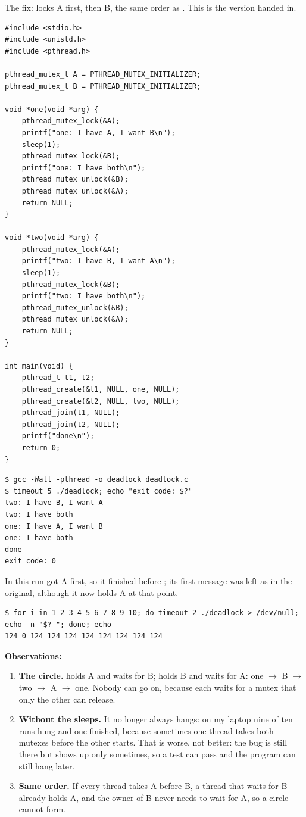 \documentclass[11pt,a4paper]{article}
\begin{document}
The fix:  locks A first, then B, the same order as . This is the
version handed in.

\begin{lstlisting}[style=ccode,caption={deadlock.c, fixed}]
#include <stdio.h>
#include <unistd.h>
#include <pthread.h>

pthread_mutex_t A = PTHREAD_MUTEX_INITIALIZER;
pthread_mutex_t B = PTHREAD_MUTEX_INITIALIZER;

void *one(void *arg) {
    pthread_mutex_lock(&A);
    printf("one: I have A, I want B\n");
    sleep(1);
    pthread_mutex_lock(&B);
    printf("one: I have both\n");
    pthread_mutex_unlock(&B);
    pthread_mutex_unlock(&A);
    return NULL;
}

void *two(void *arg) {
    pthread_mutex_lock(&A);
    printf("two: I have B, I want A\n");
    sleep(1);
    pthread_mutex_lock(&B);
    printf("two: I have both\n");
    pthread_mutex_unlock(&B);
    pthread_mutex_unlock(&A);
    return NULL;
}

int main(void) {
    pthread_t t1, t2;
    pthread_create(&t1, NULL, one, NULL);
    pthread_create(&t2, NULL, two, NULL);
    pthread_join(t1, NULL);
    pthread_join(t2, NULL);
    printf("done\n");
    return 0;
}
\end{lstlisting}

\begin{lstlisting}[caption={The fixed version}]
$ gcc -Wall -pthread -o deadlock deadlock.c
$ timeout 5 ./deadlock; echo "exit code: $?"
two: I have B, I want A
two: I have both
one: I have A, I want B
one: I have both
done
exit code: 0
\end{lstlisting}

In this run  got A first, so it finished before ; its first message was
left as in the original, although it now holds A at that point.

\begin{lstlisting}[caption={The original version without the two sleep(1) lines, ten runs}]
$ for i in 1 2 3 4 5 6 7 8 9 10; do timeout 2 ./deadlock > /dev/null; echo -n "$? "; done; echo
124 0 124 124 124 124 124 124 124 124
\end{lstlisting}

\textbf{Observations:}
\begin{enumerate}
  \item \textbf{The circle.}  holds A and waits for B;  holds B and waits
  for A: one \(\rightarrow\) B \(\rightarrow\) two \(\rightarrow\) A \(\rightarrow\) one. Nobody
  can go on, because each waits for a mutex that only the other can release.
  \item \textbf{Without the sleeps.} It no longer always hangs: on my laptop nine of ten runs
  hung and one finished, because sometimes one thread takes both mutexes before the other
  starts. That is worse, not better: the bug is still there but shows up only sometimes, so a
  test can pass and the program can still hang later.
  \item \textbf{Same order.} If every thread takes A before B, a thread that waits for B
  already holds A, and the owner of B never needs to wait for A, so a circle cannot form.
\end{enumerate}
\end{document}
